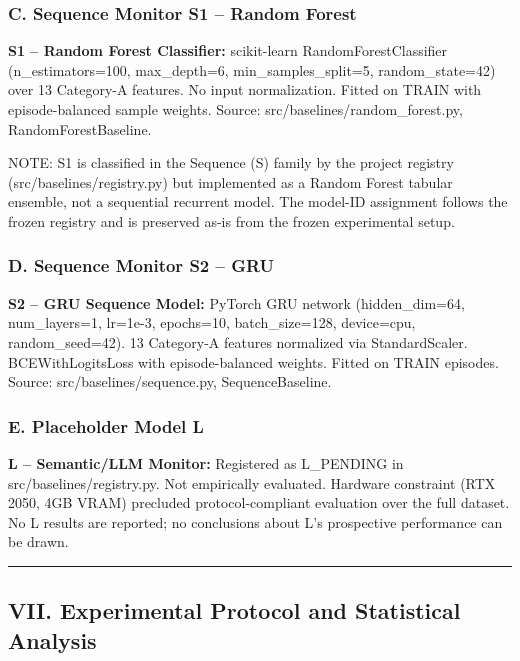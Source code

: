 \documentclass[
]{article}
\begin{document}
\subsubsection{C. Sequence Monitor S1 -- Random
Forest}\label{c.-sequence-monitor-s1-random-forest}

\textbf{S1 -- Random Forest Classifier:} scikit-learn
RandomForestClassifier (n\_estimators=100, max\_depth=6,
min\_samples\_split=5, random\_state=42) over 13 Category-A features. No
input normalization. Fitted on TRAIN with episode-balanced sample
weights. Source: src/baselines/random\_forest.py, RandomForestBaseline.

NOTE: S1 is classified in the Sequence (S) family by the project
registry (src/baselines/registry.py) but implemented as a Random Forest
tabular ensemble, not a sequential recurrent model. The model-ID
assignment follows the frozen registry and is preserved as-is from the
frozen experimental setup.

\subsubsection{D. Sequence Monitor S2 --
GRU}\label{d.-sequence-monitor-s2-gru}

\textbf{S2 -- GRU Sequence Model:} PyTorch GRU network (hidden\_dim=64,
num\_layers=1, lr=1e-3, epochs=10, batch\_size=128, device=cpu,
random\_seed=42). 13 Category-A features normalized via StandardScaler.
BCEWithLogitsLoss with episode-balanced weights. Fitted on TRAIN
episodes. Source: src/baselines/sequence.py, SequenceBaseline.

\subsubsection{E. Placeholder Model L}\label{e.-placeholder-model-l}

\textbf{L -- Semantic/LLM Monitor:} Registered as L\_PENDING in
src/baselines/registry.py. Not empirically evaluated. Hardware
constraint (RTX 2050, 4GB VRAM) precluded protocol-compliant evaluation
over the full dataset. No L results are reported; no conclusions about
L's prospective performance can be drawn.

\begin{center}\rule{0.5\linewidth}{0.5pt}\end{center}

\subsection{VII. Experimental Protocol and Statistical
Analysis}\label{vii.-experimental-protocol-and-statistical-analysis}
\end{document}
